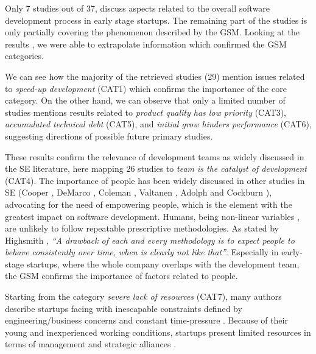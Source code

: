 \documentclass[10pt,journal,letterpaper,compsoc]{IEEEtran}
\begin{document}
Only 7 studies out of 37, discuss aspects related to the overall software development process in early stage startups. The remaining part of the studies is only partially covering the phenomenon described by the GSM. Looking at the results%
, we were able to extrapolate information which confirmed the GSM categories.

We can see how the majority of the retrieved studies (29) mention issues related to \textit{speed-up development} (CAT1) which confirms the importance of the core category. On the other hand, we can observe that only a limited number of studies mentions results related to \textit{product quality has low priority} (CAT3), \textit{accumulated technical debt} (CAT5), and \textit{initial grow hinders performance} (CAT6), suggesting directions of possible future primary studies.

These results confirm the relevance of development teams as widely discussed in the SE literature, here mapping 26 studies to \textit{team is the catalyst of development} (CAT4). The importance of people has been widely discussed in other studies in SE (Cooper \cite{Cooper1986}, DeMarco \cite{peopleware-demarco1999}, Coleman \cite{Coleman2004}, Valtanen \cite{Valtanen2008},  Adolph \cite{Adolph2011} and Cockburn \cite{people-first-order}), advocating for the need of empowering people, which is the element with the greatest impact on software development. Humans, being non-linear variables%
, are unlikely to follow repeatable prescriptive methodologies. As stated by Highsmith \cite{Highsmith2000}, \textit{``A drawback of each and every methodology is to expect people to behave consistently over time, when is clearly not like that''}. Especially in early-stage startups, where the whole company overlaps with the development team, the GSM confirms the importance of factors related to people.

Starting from the category \textit{severe lack of resources} (CAT7), many authors describe startups facing with inescapable constraints defined by engineering/business concerns and constant time-pressure \cite{Camel1994a, Cugola98softwareprocesses:}. Because of their young and inexperienced working conditions, startups present limited resources in terms of management and strategic alliances \cite{Sutton2000}.
\end{document}
